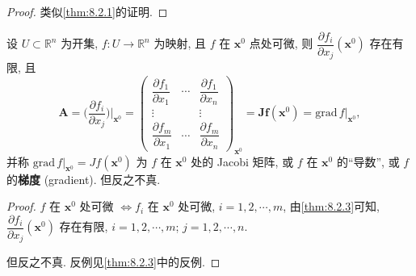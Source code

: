 \begin{proof}
类似\cref{thm:8.2.1}的证明.
\end{proof}

\setcounter{theorem}{3}
\begin{theoremp}[可微的必要条件]\label{thm:8.2.3p}
设 $U \subset \mathbb{R}^{n}$ 为开集, $f: U \to \mathbb{R}^{n}$ 为映射, 且 $f$ 在 $\boldsymbol{x}^{0}$ 点处可微, 则 $\dfrac{\partial f_{i}}{\partial x_{j}}(\boldsymbol{x}^{0})$ 存在有限, 且
\[
  \boldsymbol{A} = \Big(\frac{\partial f_{i}}{\partial x_{j}}\Big)\Big|_{\boldsymbol{x}^{0}} = \begin{pmatrix}
    \dfrac{\partial f_{1}}{\partial x_{1}} & \cdots & \dfrac{\partial f_{1}}{\partial x_{n}} \\[2mm]
    \vdots & & \vdots \\[1mm]
    \dfrac{\partial f_{m}}{\partial x_{1}} & \cdots & \dfrac{\partial f_{m}}{\partial x_{n}}
  \end{pmatrix}_{\boldsymbol{x}^{0}} = \boldsymbol{J}\boldsymbol{f}(\boldsymbol{x}^{0}) = \mathrm{grad}\,f\Big|_{\boldsymbol{x}^{0}},
\]
并称 $\mathrm{grad}\,f\big|_{\boldsymbol{x}^{0}} = Jf(\boldsymbol{x}^{0})$ 为 $f$ 在 $\boldsymbol{x}^{0}$ 处的 Jacobi 矩阵, 或 $f$ 在 $\boldsymbol{x}^{0}$ 的``导数'', 或 $f$ 的\textbf{梯度} (gradient). 但反之不真.
\end{theoremp}

\begin{proof}
$f$ 在 $\boldsymbol{x}^{0}$ 处可微 $\Leftrightarrow f_{i}$ 在 $\boldsymbol{x}^{0}$ 处可微, $i = 1, 2, \cdots, m$, 由\cref{thm:8.2.3}可知, $\dfrac{\partial f_{i}}{\partial x_{j}}(\boldsymbol{x}^{0})$ 存在有限, $i = 1, 2, \cdots, m$; $j = 1, 2, \cdots, n$.

但反之不真. 反例见\cref{thm:8.2.3}中的反例.
\end{proof}

